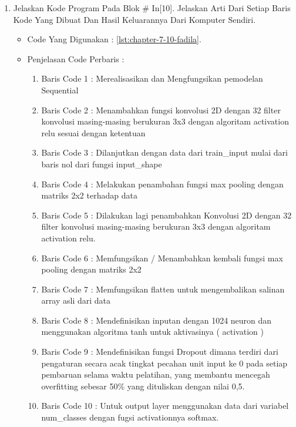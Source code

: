 \begin{enumerate}
\begin{itemize}
\par
\par
\end{itemize}
\par
\par
\par
\item Jelaskan Kode Program Pada Blok \# In[10]. Jelaskan Arti Dari Setiap Baris Kode Yang Dibuat Dan Hasil Keluarannya Dari Komputer Sendiri.
\begin{itemize}
\item Code Yang Digunakan : \ref{lst:chapter-7-10-fadila}.

\par
\par
\item Penjelasan Code Perbaris	: 
\begin{enumerate}
\item Baris Code 1	: Merealisasikan dan Mengfungsikan pemodelan Sequential
\item Baris Code 2	: Menambahkan fungsi konvolusi 2D dengan 32 filter konvolusi masing-masing berukuran 3x3 dengan algoritam activation relu sesuai dengan ketentuan
\item Baris Code 3	: Dilanjutkan dengan data dari train\_input mulai dari baris nol dari fungsi input\_shape
\item Baris Code 4	: Melakukan penambahan fungsi max pooling dengan matriks 2x2 terhadap data
\item Baris Code 5	: Dilakukan lagi penambahkan Konvolusi 2D dengan 32 filter konvolusi masing-masing berukuran 3x3 dengan algoritam activation relu.
\item Baris Code 6	: Memfungsikan / Menambahkan kembali fungsi max pooling dengan matriks 2x2
\item Baris Code 7	: Memfungsikan flatten untuk mengembalikan salinan array asli dari data
\item Baris Code 8	: Mendefinisikan inputan dengan 1024 neuron dan menggunakan algoritma tanh untuk aktivasinya ( activation )
\item Baris Code 9	: Mendefinisikan fungsi Dropout dimana terdiri dari pengaturan secara acak tingkat pecahan unit input ke 0 pada setiap pembaruan selama waktu pelatihan, yang membantu mencegah overfitting sebesar 50\%  yang dituliskan dengan nilai 0,5.
\item Baris Code 10	: Untuk output layer menggunakan data dari variabel num\_classes dengan fugsi activationnya softmax.

\end{enumerate}
\end{itemize}
\end{enumerate}
